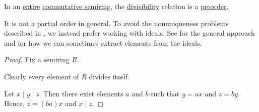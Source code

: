 \begin{proposition}\label{thm:semiring_divisibility_order}
  In an \hyperref[def:entire_semiring]{entire} \hyperref[def:semiring/commutative]{commutative semiring}, the \hyperref[def:divisibility]{divisibility} relation is a \hyperref[def:preordered_set]{preorder}.

  It is not a partial order in general. To avoid the nonuniqueness problems described in , we instead prefer working with ideals. See  for the general approach and  for how we can sometimes extract elements from the ideals.
\end{proposition}
\begin{proof}
  Fix a semiring \( R \).

   Clearly every element of \( R \) divides itself.

   Let \( x \mid y \mid z \). Then there exist elements \( a \) and \( b \) such that \( y = a x \) and \( z = b y \). Hence, \( z = (ba) x \) and \( x \mid z \).
\end{proof}
